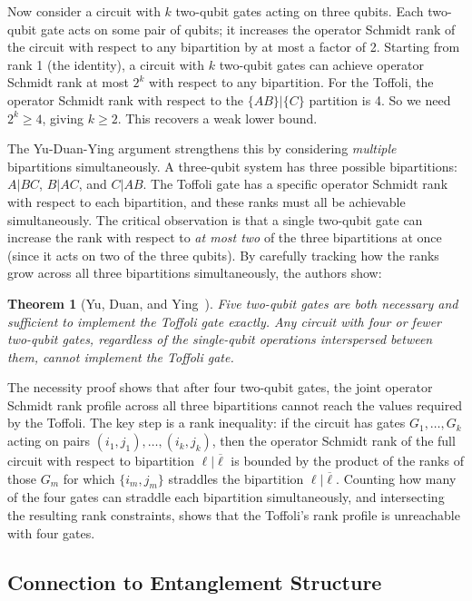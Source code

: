 \documentclass[12pt, a4paper, oneside]{report}
\theoremstyle{plain}
\newtheorem{theorem}{Theorem}[chapter]
\theoremstyle{definition}
\theoremstyle{remark}
\begin{document}
Now consider a circuit with $k$ two-qubit gates acting on three qubits. Each two-qubit gate
acts on some pair of qubits; it increases the operator Schmidt rank of the circuit with
respect to any bipartition by at most a factor of 2. Starting from rank 1 (the identity),
a circuit with $k$ two-qubit gates can achieve operator Schmidt rank at most $2^k$ with
respect to any bipartition. For the Toffoli, the operator Schmidt rank with respect to the
$\{AB\}|\{C\}$ partition is 4. So we need $2^k \geq 4$, giving $k \geq 2$. This recovers a
weak lower bound.

The Yu-Duan-Ying argument strengthens this by considering \emph{multiple} bipartitions
simultaneously. A three-qubit system has three possible bipartitions: $A|BC$, $B|AC$, and
$C|AB$. The Toffoli gate has a specific operator Schmidt rank with respect to each
bipartition, and these ranks must all be achievable simultaneously. The critical observation
is that a single two-qubit gate can increase the rank with respect to \emph{at most two} of
the three bipartitions at once (since it acts on two of the three qubits). By carefully
tracking how the ranks grow across all three bipartitions simultaneously, the authors show:

\begin{theorem}[Yu, Duan, and Ying~\cite{yu2013}]
	\label{thm:yu-duan-ying}
	Five two-qubit gates are both necessary and sufficient to implement the Toffoli gate exactly.
	Any circuit with four or fewer two-qubit gates, regardless of the single-qubit operations
	interspersed between them, cannot implement the Toffoli gate.
\end{theorem}

The necessity proof shows that after four two-qubit gates, the joint operator Schmidt rank
profile across all three bipartitions cannot reach the values required by the Toffoli. The
key step is a rank inequality: if the circuit has gates $G_1, \ldots, G_k$ acting on pairs
$(i_1, j_1), \ldots, (i_k, j_k)$, then the operator Schmidt rank of the full circuit with
respect to bipartition $\ell | \overline{\ell}$ is bounded by the product of the ranks of
those $G_m$ for which $\{i_m, j_m\}$ straddles the bipartition $\ell | \overline{\ell}$.
Counting how many of the four gates can straddle each bipartition simultaneously, and
intersecting the resulting rank constraints, shows that the Toffoli's rank profile is
unreachable with four gates.

\subsection{Connection to Entanglement Structure}
\end{document}
